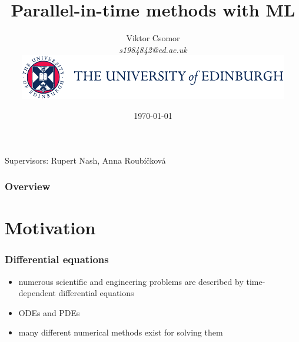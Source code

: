 \documentclass[xcolor=x11names,compress,usenames,dvipsnames,mathsans]{beamer}
\title[Parallel-in-time methods with ML]{Parallel-in-time methods with ML}
\author[author]{Viktor Csomor \\
\textit{s1984842@ed.ac.uk} \\
\vspace{1em}
\includegraphics[scale=.8]{logo_colour.pdf}
} %
\date{\today}
\begin{document}
\begin{frame}
\titlepage %
\begin{center}
Supervisors:
Rupert Nash, Anna Roubíčková
\end{center}
\end{frame}

\begin{frame}
\frametitle{Overview} %
\tableofcontents %
\end{frame}



\section{Motivation}

\begin{frame}
\frametitle{Differential equations}
\begin{itemize}
	\item numerous scientific and engineering problems are described by time-dependent differential equations
	\item ODEs and PDEs
	\item many different numerical methods exist for solving them \cite{suli2003}
\end{itemize}
\end{frame}
\end{document}
